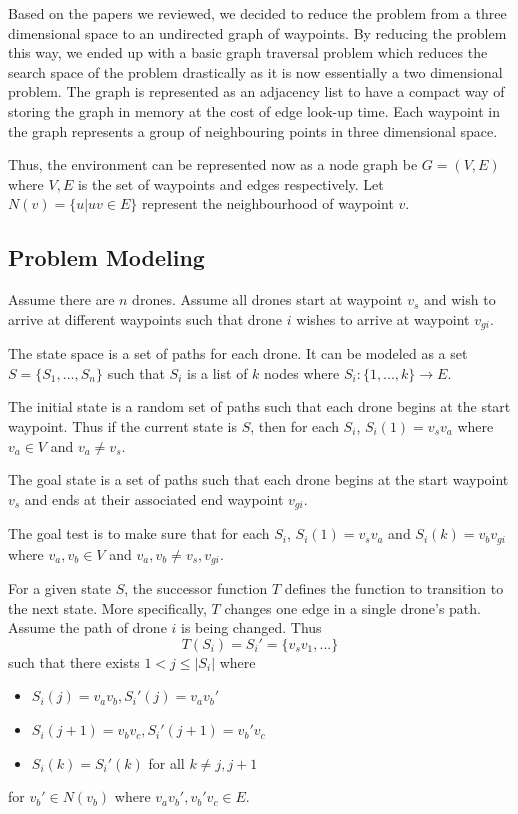 \documentclass[conference]{IEEEtran}
\begin{document}
Based on the papers we reviewed, we decided to reduce the problem from a three dimensional space to an undirected graph of waypoints. By reducing the problem this way, we ended up with a basic graph traversal problem which reduces the search space of the problem drastically as it is now essentially a two dimensional problem. The graph is represented as an adjacency list to have a compact way of storing the graph in memory at the cost of edge look-up time. Each waypoint in the graph represents a group of neighbouring points in three dimensional space.

Thus, the environment can be represented now as a node graph be $G = (V, E)$ where $V, E$ is the set of waypoints and edges respectively. Let $N(v) = \{ u | uv \in E \}$ represent the neighbourhood of waypoint $v$.

\subsection{Problem Modeling}
Assume there are $n$ drones. Assume all drones start at waypoint $v_s$ and wish to arrive at different waypoints such that drone $i$ wishes to arrive at waypoint $v_{gi}$.

The state space is a set of paths for each drone. It can be modeled as a set $S = \{S_1, ..., S_n\}$ such that $S_i$ is a list of $k$ nodes where $S_i : \{1, ..., k\} \rightarrow E$.

The initial state is a random set of paths such that each drone begins at the start waypoint. Thus if the current state is $S$, then for each $S_i$, $S_i(1) = v_sv_a$ where $v_a \in V$ and $v_a\neq v_s$.

The goal state is a set of paths such that each drone begins at the start waypoint $v_s$ and ends at their associated end waypoint $v_{gi}$.

The goal test is to make sure that for each $S_i$, $S_i(1) = v_sv_a$ and $S_i(k) = v_bv_{gi}$ where $v_a, v_b \in V$ and $v_a, v_b \neq v_s, v_{gi}$.

For a given state $S$, the successor function $T$ defines the function to transition to the next state. More specifically, $T$ changes one edge in a single drone's path. Assume the path of drone $i$ is being changed. Thus
$$ T(S_i) = S_i' = \{ v_sv_1, ... \} $$
such that there exists $ 1 < j \leq |S_i| $ where
\begin{itemize}
\item $S_i(j) = v_av_b, S_i'(j) = v_av_b'$
\item $S_i(j+1) = v_bv_c, S_i'(j+1) = v_b'v_c$
\item $S_i(k) = S_i'(k)$ for all $k \neq j, j+1$
\end{itemize}
for $v_b' \in N(v_b)$ where $v_av_b', v_b'v_c \in E$.
\end{document}
